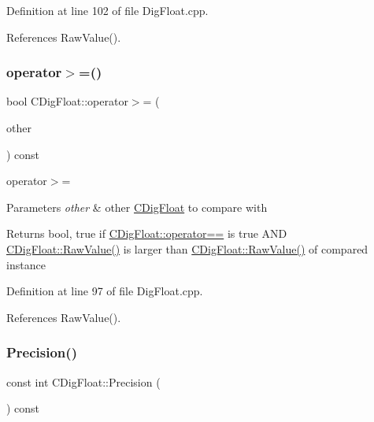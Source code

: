 Definition at line 102 of file Dig\+Float.\+cpp.



References Raw\+Value().

\mbox{\label{classCDigFloat_a08f4104630ae80e20f2768c28abea10f}} 
\subsubsection{\texorpdfstring{operator$>$=()}{operator>=()}}
{\footnotesize\ttfamily bool C\+Dig\+Float\+::operator$>$= (\begin{DoxyParamCaption}\item[{const \hyperlink{classCDigFloat}{C\+Dig\+Float} \&}]{other }\end{DoxyParamCaption}) const}



operator$>$= 


\begin{DoxyParams}{Parameters}
{\em other} & other \hyperlink{classCDigFloat}{C\+Dig\+Float} to compare with \\
\hline
\end{DoxyParams}
\begin{DoxyReturn}{Returns}
bool, true if \hyperlink{classCDigFloat_ad8980d984bf2bab71d15b830fd0180a5}{C\+Dig\+Float\+::operator==} is true A\+ND \hyperlink{classCDigFloat_ab6d3001a549d7496156321cbb26dde51}{C\+Dig\+Float\+::\+Raw\+Value()} is larger than \hyperlink{classCDigFloat_ab6d3001a549d7496156321cbb26dde51}{C\+Dig\+Float\+::\+Raw\+Value()} of compared instance 
\end{DoxyReturn}


Definition at line 97 of file Dig\+Float.\+cpp.



References Raw\+Value().

\mbox{\label{classCDigFloat_a95875f6f7246debee0d00b0c41c82aee}} 
\subsubsection{\texorpdfstring{Precision()}{Precision()}\hspace{0.1cm}{\footnotesize\ttfamily [1/2]}}
{\footnotesize\ttfamily const int C\+Dig\+Float\+::\+Precision (\begin{DoxyParamCaption}{ }\end{DoxyParamCaption}) const\hspace{0.3cm}{\ttfamily [inline]}}



